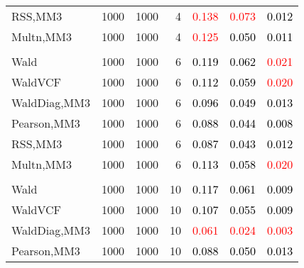\documentclass[
]{article}
\begin{document}
\begin{table}[H]
{\begin{tabular}[t]{lrrrrrr}
\hspace{1em}RSS,MM3 & 1000 & 1000 & 4 & \textcolor{red}{0.138} & \textcolor{red}{0.073} & \textcolor{black}{0.012}\\
\hspace{1em}Multn,MM3 & 1000 & 1000 & 4 & \textcolor{red}{0.125} & \textcolor{black}{0.050} & \textcolor{black}{0.011}\\
\addlinespace[0.3em]
\multicolumn{7}{l}{\textbf{1F 15V}}\\
\hspace{1em}Wald & 1000 & 1000 & 6 & \textcolor{black}{0.119} & \textcolor{black}{0.062} & \textcolor{red}{0.021}\\
\hspace{1em}WaldVCF & 1000 & 1000 & 6 & \textcolor{black}{0.112} & \textcolor{black}{0.059} & \textcolor{red}{0.020}\\
\hspace{1em}WaldDiag,MM3 & 1000 & 1000 & 6 & \textcolor{black}{0.096} & \textcolor{black}{0.049} & \textcolor{black}{0.013}\\
\hspace{1em}Pearson,MM3 & 1000 & 1000 & 6 & \textcolor{black}{0.088} & \textcolor{black}{0.044} & \textcolor{black}{0.008}\\
\hspace{1em}RSS,MM3 & 1000 & 1000 & 6 & \textcolor{black}{0.087} & \textcolor{black}{0.043} & \textcolor{black}{0.012}\\
\hspace{1em}Multn,MM3 & 1000 & 1000 & 6 & \textcolor{black}{0.113} & \textcolor{black}{0.058} & \textcolor{red}{0.020}\\
\addlinespace[0.3em]
\multicolumn{7}{l}{\textbf{2F 10V}}\\
\hspace{1em}Wald & 1000 & 1000 & 10 & \textcolor{black}{0.117} & \textcolor{black}{0.061} & \textcolor{black}{0.009}\\
\hspace{1em}WaldVCF & 1000 & 1000 & 10 & \textcolor{black}{0.107} & \textcolor{black}{0.055} & \textcolor{black}{0.009}\\
\hspace{1em}WaldDiag,MM3 & 1000 & 1000 & 10 & \textcolor{red}{0.061} & \textcolor{red}{0.024} & \textcolor{red}{0.003}\\
\hspace{1em}Pearson,MM3 & 1000 & 1000 & 10 & \textcolor{black}{0.088} & \textcolor{black}{0.050} & \textcolor{black}{0.013}\\

\end{tabular}}
\end{table}
\end{document}
